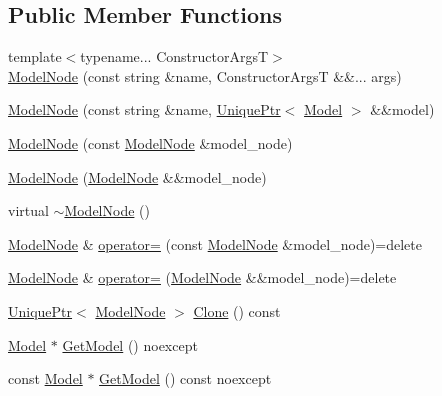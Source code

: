 \subsection*{Public Member Functions}
\begin{DoxyCompactItemize}
\item 
{\footnotesize template$<$typename... Constructor\+ArgsT$>$ }\\\hyperlink{classmage_1_1_model_node_ab8d77a4792224d8909fb399393b8294f}{Model\+Node} (const string \&name, Constructor\+ArgsT \&\&... args)
\item 
\hyperlink{classmage_1_1_model_node_a15d6a41cc5cdc90310313147100c1d6f}{Model\+Node} (const string \&name, \hyperlink{namespacemage_a3316d7143a973e37adf1110f2e80ca31}{Unique\+Ptr}$<$ \hyperlink{classmage_1_1_model}{Model} $>$ \&\&model)
\item 
\hyperlink{classmage_1_1_model_node_a409c098ddecf20d1b393d43c15d16482}{Model\+Node} (const \hyperlink{classmage_1_1_model_node}{Model\+Node} \&model\+\_\+node)
\item 
\hyperlink{classmage_1_1_model_node_a19ba577112ea488f227ea31642fb2cb2}{Model\+Node} (\hyperlink{classmage_1_1_model_node}{Model\+Node} \&\&model\+\_\+node)
\item 
virtual \hyperlink{classmage_1_1_model_node_a131c0062a1bed3d29fade27e602bec44}{$\sim$\+Model\+Node} ()
\item 
\hyperlink{classmage_1_1_model_node}{Model\+Node} \& \hyperlink{classmage_1_1_model_node_ad8378279b79930dfe98d176dbc1c5db9}{operator=} (const \hyperlink{classmage_1_1_model_node}{Model\+Node} \&model\+\_\+node)=delete
\item 
\hyperlink{classmage_1_1_model_node}{Model\+Node} \& \hyperlink{classmage_1_1_model_node_ad39321f4d392aa4e28169b8d7a08af68}{operator=} (\hyperlink{classmage_1_1_model_node}{Model\+Node} \&\&model\+\_\+node)=delete
\item 
\hyperlink{namespacemage_a3316d7143a973e37adf1110f2e80ca31}{Unique\+Ptr}$<$ \hyperlink{classmage_1_1_model_node}{Model\+Node} $>$ \hyperlink{classmage_1_1_model_node_a766f90e1d626c455ba552a3ded08b948}{Clone} () const
\item 
\hyperlink{classmage_1_1_model}{Model} $\ast$ \hyperlink{classmage_1_1_model_node_a8964223fd592fd23949d6f996c40a482}{Get\+Model} () noexcept
\item 
const \hyperlink{classmage_1_1_model}{Model} $\ast$ \hyperlink{classmage_1_1_model_node_ad8c4978c4d14ed015fdb517ba86ebd93}{Get\+Model} () const noexcept
\end{DoxyCompactItemize}

